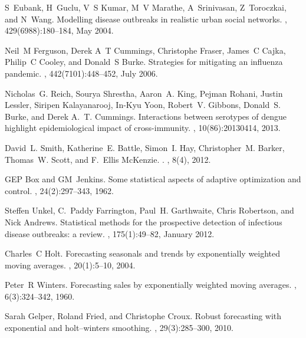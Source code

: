 \documentclass[a4paper]{article}
\begin{document}
\begin{thebibliography}{100}
S~Eubank, H~Guclu, V~S Kumar, M~V Marathe, A~Srinivasan, Z~Toroczkai, and
  N~Wang.
\newblock Modelling disease outbreaks in realistic urban social networks.
, 429(6988):180--184, May 2004.

Neil~M Ferguson, Derek A~T Cummings, Christophe Fraser, James~C Cajka, Philip~C
  Cooley, and Donald~S Burke.
\newblock Strategies for mitigating an influenza pandemic.
, 442(7101):448--452, July 2006.

Nicholas~G. Reich, Sourya Shrestha, Aaron~A. King, Pejman Rohani, Justin
  Lessler, Siripen Kalayanarooj, In-Kyu Yoon, Robert~V. Gibbons, Donald~S.
  Burke, and Derek A.~T. Cummings.
\newblock Interactions between serotypes of dengue highlight epidemiological
  impact of cross-immunity.
, 10(86):20130414, 2013.

David~L. Smith, Katherine~E. Battle, Simon~I. Hay, Christopher~M. Barker,
  Thomas~W. Scott, and F.~Ellis McKenzie.
.
, 8(4), 2012.

GEP Box and GM~Jenkins.
\newblock Some statistical aspects of adaptive optimization and control.
,
  24(2):297--343, 1962.

Steffen Unkel, C.~Paddy Farrington, Paul~H. Garthwaite, Chris Robertson, and
  Nick Andrews.
\newblock Statistical methods for the prospective detection of infectious
  disease outbreaks: a review.
, 175(1):49--82, January 2012.

Charles~C Holt.
\newblock Forecasting seasonals and trends by exponentially weighted moving
  averages.
, 20(1):5--10, 2004.

Peter~R Winters.
\newblock Forecasting sales by exponentially weighted moving averages.
, 6(3):324--342, 1960.

Sarah Gelper, Roland Fried, and Christophe Croux.
\newblock Robust forecasting with exponential and holt--winters smoothing.
, 29(3):285--300, 2010.


\end{thebibliography}
\end{document}
